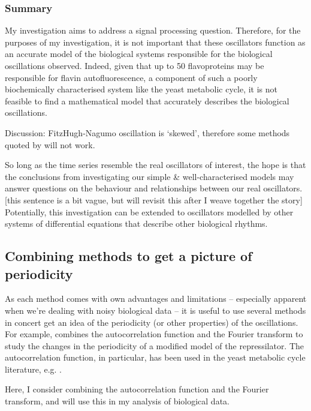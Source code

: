 \subsubsection{Summary}
\label{subsubsec:analysis-characterisation-acf-summary}

My investigation aims to address a signal processing question.  Therefore, for the purposes of my investigation, it is not important that these oscillators function as an accurate model of the biological systems responsible for the biological oscillations observed.  Indeed, given that up to 50 flavoproteins may be responsible for flavin autofluorescence, a component of such a poorly biochemically characterised system like the yeast metabolic cycle, it is not feasible to find a mathematical model that accurately describes the biological oscillations.

Discussion: FitzHugh-Nagumo oscillation is `skewed', therefore some methods quoted by \textcite{zielinskiStrengthsLimitationsPeriod2014} will not work.

So long as the time series resemble the real oscillators of interest, the hope is that the conclusions from investigating our simple \& well-characterised models may answer questions on the behaviour and relationships between our real oscillators. [this sentence is a bit vague, but will revisit this after I weave together the story]  Potentially, this investigation can be extended to oscillators modelled by other systems of differential equations that describe other biological rhythms.

\subsection{Combining methods to get a picture of periodicity}
\label{subsec:analysis-characterisation-combined}

As each method comes with own advantages and limitations -- especially apparent when we're dealing with noisy biological data -- it is useful to use several methods in concert get an idea of the periodicity (or other properties) of the oscillations.
For example, \textcite{potvin-trottierSynchronousLongtermOscillations2016} combines the autocorrelation function and the Fourier transform to study the changes in the periodicity of a modified model of the repressilator.
The autocorrelation function, in particular, has been used in the yeast metabolic cycle literature, e.g. \textcite{papagiannakisAutonomousMetabolicOscillations2017}.

Here, I consider combining the autocorrelation function and the Fourier transform, and will use this in my analysis of biological data.

